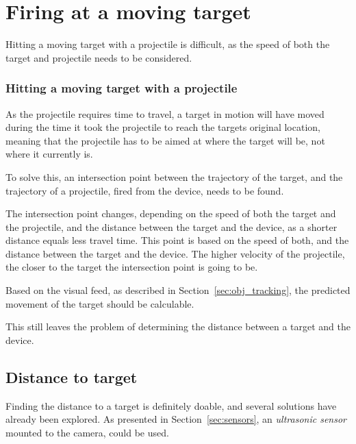 \section{Firing at a moving target}
Hitting a moving target with a projectile is difficult, as the speed of both the target and projectile needs to be considered.

\subsubsection{Hitting a moving target with a projectile}
As the projectile requires time to travel, a target in motion will have moved during the time it took the projectile to reach the targets original location, meaning that the projectile has to be aimed at where the target will be, not where it currently is.

To solve this, an intersection point between the trajectory of the target, and the trajectory of a projectile, fired from the device, needs to be found.

The intersection point changes, depending on the speed of both the target and the projectile, and the distance between the target and the device, as a shorter distance equals less travel time.
This point is based on the speed of both, and the distance between the target and the device. 
The higher velocity of the projectile, the closer to the target the intersection point is going to be.

Based on the visual feed, as described in Section~\ref{sec:obj_tracking}, the predicted movement of the target should be calculable.


This still leaves the problem of determining the distance between a target and the device.
\subsection{Distance to target}
Finding the distance to a target is definitely doable, and several solutions have already been explored.
As presented in Section~\ref{sec:sensors}, an \textit{ultrasonic sensor} mounted to the camera, could be used.

